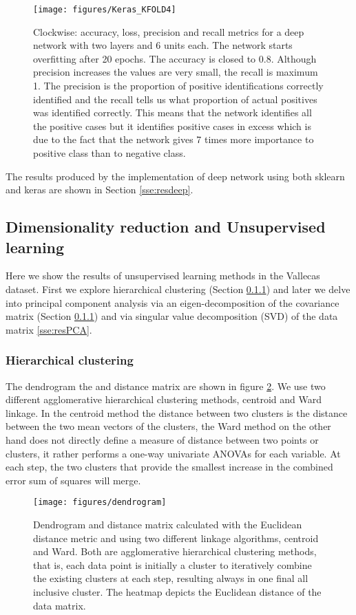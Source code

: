 \documentclass[11pt]{article}
\theoremstyle{definition}
\theoremstyle{remark}
\begin{document}
\begin{figure}[H]
        \centering
        \texttt{[image: figures/Keras\_KFOLD4]}
        \caption{Clockwise: accuracy, loss, precision and recall metrics for a deep network with two layers and 6 units each. The network starts overfitting after 20 epochs. The accuracy is closed to 0.8. Although precision increases the values are very small, the recall is maximum 1. The precision is the proportion of positive identifications correctly identified and the recall tells us what proportion of actual positives was identified correctly. This means that the network identifies all the positive cases but it identifies positive cases in excess which is due to the fact that the network gives 7 times more importance to positive class than to negative class. 
        } \label{fig:kerasmetricsres}
\end{figure}

The results produced by the implementation of deep network using both sklearn and keras are shown in Section \ref{sse:resdeep}.

\subsection{Dimensionality reduction and Unsupervised learning}
\label{sse:resunsupervised}
Here we show the results of unsupervised learning methods in the Vallecas dataset. First we explore hierarchical clustering (Section \ref{sse:reshierarchical}) and later we delve into principal component analysis via an eigen-decomposition of the covariance matrix (Section \ref{sse:reshierarchical}) and via singular value decomposition (SVD) of the data matrix \ref{sse:resPCA}.

\subsubsection{Hierarchical clustering}
\label{sse:reshierarchical}

The dendrogram the and distance matrix are shown in figure \ref{fig:dendrogram}. We use two different agglomerative hierarchical clustering methods, centroid and Ward linkage. In the centroid method the distance between two clusters is the distance between the two mean vectors of the clusters, the Ward method on the other hand does not directly define a measure of distance between two points or clusters, it rather performs a one-way univariate ANOVAs for each variable. At each step, the two clusters that provide the smallest increase in the combined error sum of squares will merge. 
\begin{figure}[H]
        \centering
        \texttt{[image: figures/dendrogram]}
        \caption{Dendrogram and distance matrix calculated with the Euclidean distance metric and using two different linkage algorithms, centroid and Ward. Both are agglomerative hierarchical clustering methods, that is, each data point is initially a cluster to iteratively combine the existing clusters at each step, resulting always in one final all inclusive cluster. The heatmap depicts the Euclidean distance of the data matrix.
        } \label{fig:dendrogram}
\end{figure}
\end{document}
